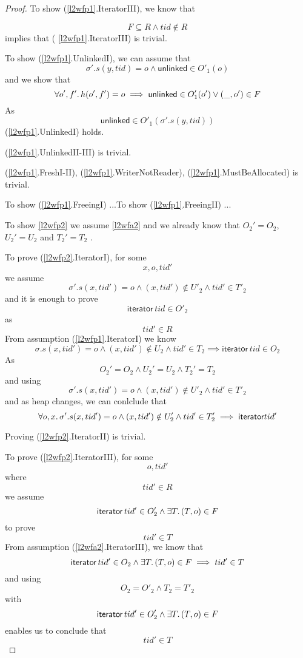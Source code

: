 \begin{proof}
 To show (\ref{l2wfp1}.\textsf{IteratorIII}), we know that 

\[F \subseteq R\land tid \notin R\] implies that ( \ref{l2wfp1}.\textsf{IteratorIII}) is trivial.

To show (\ref{l2wfp1}.\textsf{UnlinkedI}), we can assume that 
\[ \sigma'.s(y,tid) = o \land \mathsf{unlinked} \in O'_{1}(o) \]
and we show that 
\[\forall o',f' \ldotp  h(o',f') = o \implies \mathsf{unlinked} \in O'_{1}(o') \lor ( \_ ,o') \in F\]
As 
\[\mathsf{unlinked} \in O'_{1}(\sigma'.s(y,tid)) \]
(\ref{l2wfp1}.\textsf{UnlinkedI}) holds.

(\ref{l2wfp1}.\textsf{UnlinkedII-III}) is trivial.

(\ref{l2wfp1}.\textsf{FreshI-II}), (\ref{l2wfp1}.\textsf{WriterNotReader}), (\ref{l2wfp1}.\textsf{MustBeAllocated}) is trivial.

To show (\ref{l2wfp1}.\textsf{FreeingI}) ...To show (\ref{l2wfp1}.\textsf{FreeingII}) ...

To show \ref{l2wfp2} we assume \ref{l2wfa2} and we already know that $O_{2}' = O_{2}$,  $U_{2}' = U_{2}$ and $T_{2}' = T_{2}$  .

To prove (\ref{l2wfp2}.\textsf{IteratorI}), for some 
\[ x, o, tid' \]
we assume
\[
\sigma'.s(x,tid') = o \land (x,tid') \notin U'_{2} \land tid' \in T'_{2}
\]
and it is enough to prove 
\[ \mathsf{iterator} \, tid \in O'_{2} \]
as 
\[tid' \in R\]
From assumption (\ref{l2wfp1}.\textsf{IteratorI}) we know
\[ \sigma.s(x,tid') = o \land (x,tid') \notin U_{2} \land tid' \in T_{2} \implies \mathsf{iterator} \, tid \in O_{2}\]
As
\[  O_{2}' = O_{2}  \land U_{2}' = U_{2} \land T_{2}' = T_{2} \]
and using
\[
\sigma'.s(x,tid') = o \land (x,tid') \notin U'_{2} \land tid' \in T'_{2}
\]
and as heap changes, we can conlclude that 
\[\forall o,x \ldotp \sigma'.s(x,tid') = o \land (x,tid') \notin U'_{2} \land tid' \in T'_{2} \implies \mathsf{iterator} tid' \]

Proving (\ref{l2wfp2}.\textsf{IteratorII}) is trivial.


To prove (\ref{l2wfp2}.\textsf{IteratorIII}),  for some
\[o,tid' \] where 
\[tid' \in R\]
we assume 
\[ \mathsf{iterator} \, tid' \in O'_{2} \land \exists T \ldotp (T,o) \in  F \] to prove
\[tid' \in T\]
From assumption  (\ref{l2wfa2}.\textsf{IteratorIII}), we know that 
\[\mathsf{iterator} \, tid' \in O_{2} \land \exists T \ldotp (T,o) \in  F  \implies tid' \in T \]
and using 
\[O_{2} = O'_{2} \land T_{2} = T'_{2}\] with
\[ \mathsf{iterator} \, tid' \in O'_{2} \land \exists T \ldotp (T,o) \in  F \]
enables us to conclude that 
\[tid' \in T\]


\end{proof}

